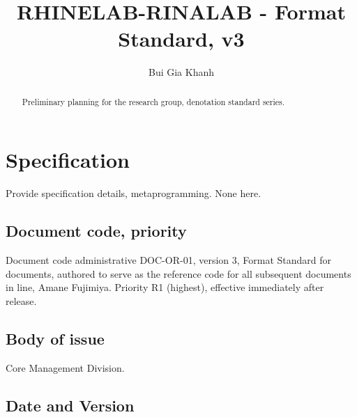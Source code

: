 \documentclass[9pt,a4paper]{article}
\title{RHINELAB-RINALAB - Format Standard, v3} %
\author{Bui Gia Khanh} %
\affiliation{} %
\begin{document}
\maketitle

\begin{abstract}
    \noindent
    Preliminary planning for the research group, denotation standard series. 

\end{abstract}

\vspace{2.5cm}



\thispagestyle{firstpage}

\pagebreak


\newgeometry{} %

\section{Specification}
\label{sec:spec}

Provide specification details, metaprogramming. None here. 

\subsection{Document code, priority}


Document code administrative DOC-OR-01, version 3, Format Standard for documents, authored to serve as the reference code for all subsequent documents in line, Amane Fujimiya. Priority R1 (highest), effective immediately after release. 

\subsection{Body of issue}

Core Management Division.

\subsection{Date and Version}
\end{document}
